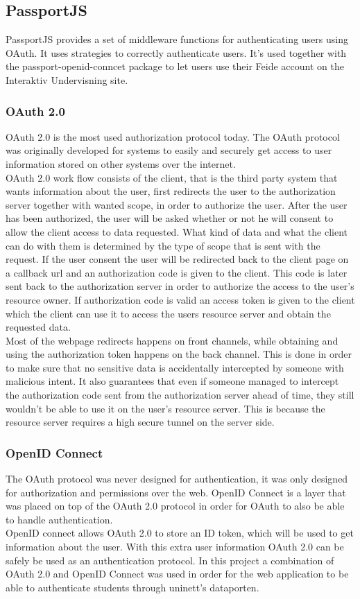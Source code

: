 \subsection{PassportJS}
PassportJS provides a set of middleware functions for authenticating users using OAuth. It uses strategies to correctly authenticate users. It's used together with the passport-openid-conncet package to let users use their Feide account on the Interaktiv Undervisning site.
\subsubsection{OAuth 2.0}
OAuth 2.0 is the most used authorization protocol today. The OAuth protocol was originally developed for systems to easily and securely get access to user information stored on other systems over the internet.\\
OAuth 2.0 work flow consists of the client, that is the third party system that wants information about the user, first redirects the user to the authorization server together with wanted scope, in order to authorize the user. After the user has been authorized, the user will be asked whether or not he will consent to allow the client access to data requested. What kind of data and what the client can do with them is determined by the type of scope that is sent with the request. If the user consent the user will be redirected back to the client page on a callback url and an authorization code is given to the client. This code is later sent back to the authorization server in order to authorize the access to the user's resource owner. If authorization code is valid an access token is given to the client which the client can use it to access the users resource server and obtain the requested data.\\
Most of the webpage redirects happens on front channels, while obtaining and using the authorization token happens on the back channel. This is done in order to make sure that no sensitive data is accidentally intercepted by someone with malicious intent. It also guarantees that even if someone managed to intercept the authorization code sent from the authorization server ahead of time, they still wouldn't be able to use it on the user's resource server. This is because the resource server requires a high secure tunnel on the server side.\\
\subsubsection{OpenID Connect}
The OAuth protocol was never designed for authentication, it was only designed for authorization and permissions over the web. OpenID Connect is a layer that was placed on top of the OAuth 2.0 protocol in order for OAuth to also be able to handle authentication.\\
OpenID connect allows OAuth 2.0 to store an ID token, which  will be used to get information about the user. With this extra user information OAuth 2.0 can be safely be used as an authentication protocol. In this project a combination of OAuth 2.0 and OpenID Connect was used in order for the web application to be able to authenticate students through uninett's dataporten. %